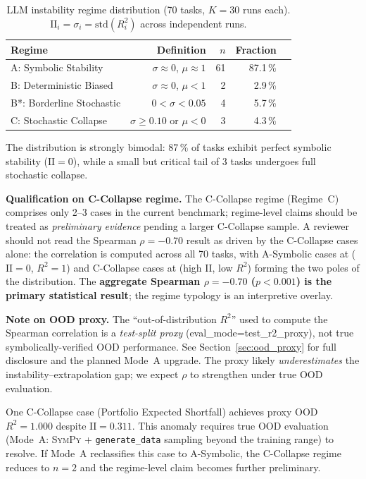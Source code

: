 \documentclass[twoside,11pt]{article}
\newcommand{\Rsq}{R^{2}}
\newcommand{\II}{\mathrm{II}}
\begin{document}
\begin{table}[h]
\centering
\caption{LLM instability regime distribution (70 tasks, $K=30$ runs each).
$\II_i = \sigma_i = \mathrm{std}(R^2_i)$ across independent runs.}
\label{tab:instability}
\begin{tabular}{lrrrr}
\toprule
Regime & Definition & $n$ & Fraction \\
\midrule
A: Symbolic Stability   & $\sigma\approx0$, $\mu\approx1$            & 61 & 87.1\,\% \\
B: Deterministic Biased & $\sigma\approx0$, $\mu<1$                  &  2 & 2.9\,\%  \\
B*: Borderline Stochastic & $0 < \sigma < 0.05$                      &  4 & 5.7\,\%  \\
C: Stochastic Collapse  & $\sigma \ge 0.10$ or $\mu < 0$             &  3 & 4.3\,\%  \\
\bottomrule
\end{tabular}
\end{table}

The distribution is strongly bimodal: 87\,\% of tasks exhibit perfect symbolic
stability ($\II=0$), while a small but critical tail of 3 tasks undergoes full
stochastic collapse.

\textbf{Qualification on C-Collapse regime.}  The C-Collapse regime
(Regime~C) comprises only 2--3 cases in the current benchmark; regime-level
claims should be treated as \emph{preliminary evidence} pending a larger
C-Collapse sample.  A reviewer should not read the Spearman $\rho=-0.70$ result
as driven by the C-Collapse cases alone: the correlation is computed across all
70 tasks, with A-Symbolic cases at ($\II=0$, $\Rsq=1$) and C-Collapse cases at
(high $\II$, low $\Rsq$) forming the two poles of the distribution.  The
\textbf{aggregate Spearman $\rho=-0.70$ ($p<0.001$) is the primary statistical
result}; the regime typology is an interpretive overlay.

\textbf{Note on OOD proxy.}  The ``out-of-distribution $\Rsq$'' used to compute
the Spearman correlation is a \emph{test-split proxy} (eval\_mode=test\_r2\_proxy),
not true symbolically-verified OOD performance.  See Section~\ref{sec:ood_proxy}
for full disclosure and the planned Mode~A upgrade.  The proxy likely
\emph{underestimates} the instability--extrapolation gap; we expect $\rho$ to
strengthen under true OOD evaluation.

One C-Collapse case (Portfolio Expected Shortfall) achieves proxy OOD $\Rsq=1.000$
despite $\II=0.311$.  This anomaly requires true OOD evaluation (Mode~A:
\textsc{SymPy} + \texttt{generate\_data} sampling beyond the training range) to
resolve.  If Mode~A reclassifies this case to A-Symbolic, the C-Collapse regime
reduces to $n=2$ and the regime-level claim becomes further preliminary.
\end{document}
